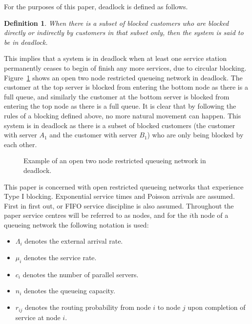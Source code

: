\documentclass{article}
\newtheorem{definition}{Definition}
\numberwithin{equation}{section}
\begin{document}
For the purposes of this paper, deadlock is defined as follows.\\

\begin{definition}\label{def:deadlock}
    When there is a subset of blocked customers who are blocked directly or
    indirectly by customers in that subset only, then the system is said
    to be in deadlock.
\end{definition}

This implies that a system is in deadlock when at least one service station
permanently ceases to begin of finish any more services, due to circular
blocking.
Figure~\ref{fig:1st_example} shows an open two node restricted queueing
network in deadlock.
The customer at the top server is blocked from entering the bottom node as
there is a full queue, and similarly the customer at the bottom server is
blocked from entering the top node as there is a full queue.
It is clear that by following the rules of a blocking defined above, no more
natural movement can happen.
This system is in deadlock as there is a subset of blocked customers (the
customer with server $A_1$ and the customer with server $B_1$) who are only
being blocked by each other.

\begin{figure}[!htbp]
  \begin{center}
  
  \end{center}
  \caption{Example of an open two node restricted queueing network in deadlock.}
  \label{fig:1st_example}
\end{figure}

This paper is concerned with open restricted queueing networks that experience
Type I blocking.
Exponential service times and Poisson arrivals are assumed.
First in first out, or FIFO service discipline is also assumed.
Throughout the paper service centres will be referred to as nodes, and for the
$i$th node of a queueing network the following notation is used:

\begin{itemize}
  \item $\Lambda_i$ denotes the external arrival rate.
  \item $\mu_i$ denotes the service rate.
  \item $c_i$ denotes the number of parallel servers.
  \item $n_i$ denotes the queueing capacity.
  \item $r_{ij}$ denotes the routing probability from node $i$ to node $j$
  upon completion of service at node $i$.
\end{itemize}
\end{document}
